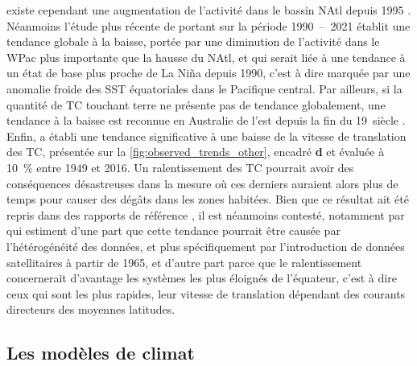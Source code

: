 \documentclass[../main.tex]{subfiles}
\begin{document}
existe cependant une augmentation de l'activité dans le bassin NAtl depuis \num{1995}
\parencite{webster_changes_2005,maue_recent_2011,wang_climate_2010,seneviratne_weather_2021}. Néanmoins l'étude plus récente de \textcite{klotzbach_trends_2022}
portant sur la période \num{1990}~--~\num{2021} établit une tendance globale à la baisse, portée par une diminution de l'activité dans le WPac plus importante
que la hausse du NAtl, et qui serait liée à une tendance à un état de base plus proche de La Niña depuis \num{1990}, c'est à dire marquée par une anomalie
froide des SST équatoriales dans le Pacifique central. Par ailleurs, si la quantité de TC touchant terre ne présente pas de tendance globalement, une tendance à
la baisse est reconnue en Australie de l'est depuis la fin du \num{19}\ieme~siècle \parencite{knutson_tropical_2019,callaghan_variability_2011}. Enfin,
\textcite{kossin_global_2018,kossin_reply_2019} a établi une tendance significative à une baisse de la vitesse de translation des TC, présentée sur la
\cref{fig:observed_trends_other}, encadré \textbf{d} et évaluée à \SI{10}{\percent} entre \num{1949} et \num{2016}. Un ralentissement des TC pourrait avoir des
conséquences désastreuses dans la mesure où ces derniers auraient alors plus de temps pour causer des dégâts dans les zones habitées. Bien que ce résultat ait
été repris dans des rapports de référence \parencite{knutson_tropical_2019,seneviratne_weather_2021}, il est néanmoins contesté, notamment par
\textcite{lanzante_uncertainties_2019,moon_climate_2019} qui estiment d'une part que cette tendance pourrait être causée par l'hétérogénéité des données, et
plus spécifiquement par l'introduction de données satellitaires à partir de \num{1965}, et d'autre part parce que le ralentissement concernerait d'avantage les
systèmes les plus éloignés de l'équateur, c'est à dire ceux qui sont les plus rapides, leur vitesse de translation dépendant des courants directeurs des
moyennes latitudes.

\subsection{Les modèles de climat}\label{sec:modèles}
\end{document}
